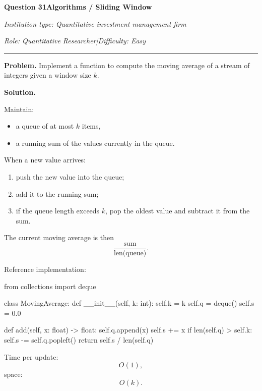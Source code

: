 \documentclass[11pt,letterpaper,openany]{book}
\newcommand{\InterviewQuestionHeader}[5]{%
  \vspace{1.0em}%
  {\large\bfseries #1\enspace #4\par}%
  {\small\itshape Institution type: #2\par}%
  {\small\itshape Role: #3\enspace |\enspace Difficulty: #5\par}%
  \vspace{0.25em}\hrule\vspace{0.45em}%
}
\begin{document}
\InterviewQuestionHeader{Question 31}{Quantitative investment management firm}{Quantitative Researcher}{Algorithms / Sliding Window}{Easy}
\textbf{Problem.} Implement a function to compute the moving average of a stream of integers given a window size \(k\).

\textbf{Solution.}

Maintain:
\begin{itemize}
\item a queue of at most \(k\) items,
\item a running sum of the values currently in the queue.
\end{itemize}

When a new value arrives:
\begin{enumerate}
\item push the new value into the queue;
\item add it to the running sum;
\item if the queue length exceeds \(k\), pop the oldest value and subtract it from the sum.
\end{enumerate}

The current moving average is then
\[
\frac{\text{sum}}{\text{len(queue)}}.
\]

Reference implementation:
\begin{codeblock}
from collections import deque

class MovingAverage:
    def __init__(self, k: int):
        self.k = k
        self.q = deque()
        self.s = 0.0

    def add(self, x: float) -> float:
        self.q.append(x)
        self.s += x
        if len(self.q) > self.k:
            self.s -= self.q.popleft()
        return self.s / len(self.q)
\end{codeblock}

Time per update:
\[
O(1),
\]
space:
\[
O(k).
\]
\end{document}
